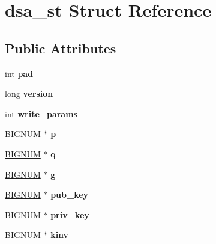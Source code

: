 \hypertarget{structdsa__st}{}\section{dsa\+\_\+st Struct Reference}
\label{structdsa__st}
\subsection*{Public Attributes}
\begin{DoxyCompactItemize}
\item 
\mbox{\label{structdsa__st_abdf71672c40a2cd7d02bc8f86f33d3c9}} 
int {\bfseries pad}
\item 
\mbox{\label{structdsa__st_a9aa35c728a9166c0671f4286f7f367cc}} 
long {\bfseries version}
\item 
\mbox{\label{structdsa__st_a4b48d1347fa55e2f68cc991d98c2daf2}} 
int {\bfseries write\+\_\+params}
\item 
\mbox{\label{structdsa__st_a63246fbe0fc27945bd32765e5538a1a6}} 
\hyperlink{structbignum__st}{B\+I\+G\+N\+UM} $\ast$ {\bfseries p}
\item 
\mbox{\label{structdsa__st_ab0cae8e320e604e2f4d18066bb02a097}} 
\hyperlink{structbignum__st}{B\+I\+G\+N\+UM} $\ast$ {\bfseries q}
\item 
\mbox{\label{structdsa__st_af5ec97a996fd695c0186eb5a9a2b0b38}} 
\hyperlink{structbignum__st}{B\+I\+G\+N\+UM} $\ast$ {\bfseries g}
\item 
\mbox{\label{structdsa__st_a2a844d480ca7c1a73dadeee215863fa6}} 
\hyperlink{structbignum__st}{B\+I\+G\+N\+UM} $\ast$ {\bfseries pub\+\_\+key}
\item 
\mbox{\label{structdsa__st_a42c62516432a22cae5b2092c8276deaa}} 
\hyperlink{structbignum__st}{B\+I\+G\+N\+UM} $\ast$ {\bfseries priv\+\_\+key}
\item 
\mbox{\label{structdsa__st_a73b0fb2db5b8546f779cb157b18f19fc}} 
\hyperlink{structbignum__st}{B\+I\+G\+N\+UM} $\ast$ {\bfseries kinv}
\item 

\end{DoxyCompactItemize}
